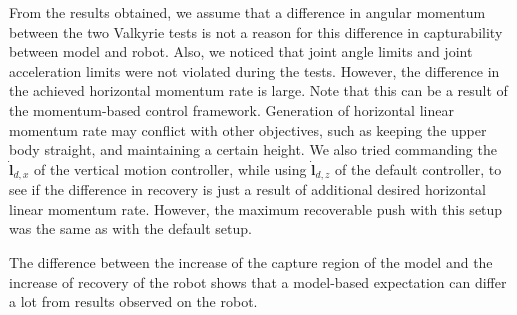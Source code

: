 \documentclass[letterpaper, 10 pt, conference]{ieeeconf}  %
\begin{document}
From the results obtained, we assume that a difference in angular momentum between the two Valkyrie tests is not a reason for this difference in capturability between model and robot. Also, we noticed that joint angle limits and joint acceleration limits were not violated during the tests. However, the difference in the achieved horizontal momentum rate is large. Note that this can be a result of the momentum-based control framework. Generation of horizontal linear momentum rate may conflict with other objectives, such as keeping the upper body straight, and maintaining a certain height. We also tried commanding the $\dot{\mathbf{l}}_{d,x}$ of the vertical motion controller, while using $\dot{\mathbf{l}}_{d,z}$ of the default controller, to see if the difference in recovery is just a result of additional desired horizontal linear momentum rate. However, the maximum recoverable push with this setup was the same as with the default setup.

The difference between the increase of the capture region of the model and the increase of recovery of the robot shows that a model-based expectation can differ a lot from results observed on the robot. 

\end{document}
